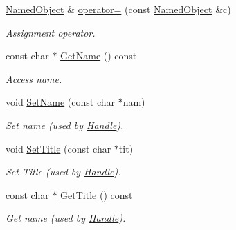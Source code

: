 \begin{DoxyCompactItemize}
\hyperlink{class_d_d4hep_1_1_named_object}{NamedObject} \& \hyperlink{class_d_d4hep_1_1_named_object_a474ed41e8d8b480401671dfe07b33eb6}{operator=} (const \hyperlink{class_d_d4hep_1_1_named_object}{NamedObject} \&c)
\begin{DoxyCompactList}\small\item\em Assignment operator. \item\end{DoxyCompactList}\item 
const char $\ast$ \hyperlink{class_d_d4hep_1_1_named_object_a41b5b07d0f87421de998bf7cb92065c6}{GetName} () const 
\begin{DoxyCompactList}\small\item\em Access name. \item\end{DoxyCompactList}\item 
void \hyperlink{class_d_d4hep_1_1_named_object_ae797352ed4559f085e6333b6394fb8ac}{SetName} (const char $\ast$nam)
\begin{DoxyCompactList}\small\item\em Set name (used by \hyperlink{class_d_d4hep_1_1_handle}{Handle}). \item\end{DoxyCompactList}\item 
void \hyperlink{class_d_d4hep_1_1_named_object_ac0ca31db35ec2162134e5a9b92e8a0d6}{SetTitle} (const char $\ast$tit)
\begin{DoxyCompactList}\small\item\em Set Title (used by \hyperlink{class_d_d4hep_1_1_handle}{Handle}). \item\end{DoxyCompactList}\item 
const char $\ast$ \hyperlink{class_d_d4hep_1_1_named_object_a2f56103ba5eb88e8d1231b5db5494468}{GetTitle} () const 
\begin{DoxyCompactList}\small\item\em Get name (used by \hyperlink{class_d_d4hep_1_1_handle}{Handle}). \item\end{DoxyCompactList}\end{DoxyCompactItemize}
